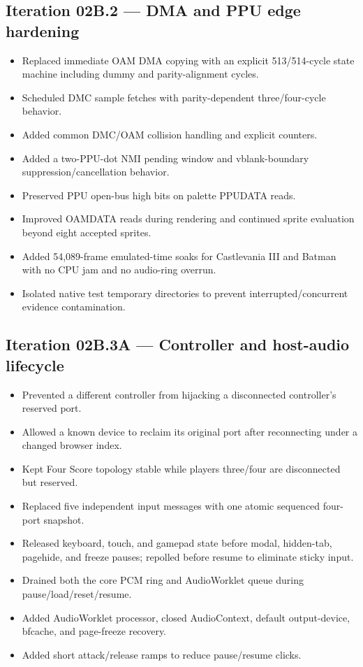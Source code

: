 \documentclass[10pt,letterpaper]{article}
\begin{document}
\subsection{Iteration 02B.2 --- DMA and PPU edge hardening}
\begin{itemize}
\item Replaced immediate OAM DMA copying with an explicit 513/514-cycle state machine including dummy and parity-alignment cycles.
\item Scheduled DMC sample fetches with parity-dependent three/four-cycle behavior.
\item Added common DMC/OAM collision handling and explicit counters.
\item Added a two-PPU-dot NMI pending window and vblank-boundary suppression/cancellation behavior.
\item Preserved PPU open-bus high bits on palette PPUDATA reads.
\item Improved OAMDATA reads during rendering and continued sprite evaluation beyond eight accepted sprites.
\item Added 54,089-frame emulated-time soaks for Castlevania III and Batman with no CPU jam and no audio-ring overrun.
\item Isolated native test temporary directories to prevent interrupted/concurrent evidence contamination.
\end{itemize}

\subsection{Iteration 02B.3A --- Controller and host-audio lifecycle}
\begin{itemize}
\item Prevented a different controller from hijacking a disconnected controller's reserved port.
\item Allowed a known device to reclaim its original port after reconnecting under a changed browser index.
\item Kept Four Score topology stable while players three/four are disconnected but reserved.
\item Replaced five independent input messages with one atomic sequenced four-port snapshot.
\item Released keyboard, touch, and gamepad state before modal, hidden-tab, pagehide, and freeze pauses; repolled before resume to eliminate sticky input.
\item Drained both the core PCM ring and AudioWorklet queue during pause/load/reset/resume.
\item Added AudioWorklet processor, closed AudioContext, default output-device, bfcache, and page-freeze recovery.
\item Added short attack/release ramps to reduce pause/resume clicks.
\end{itemize}
\end{document}
